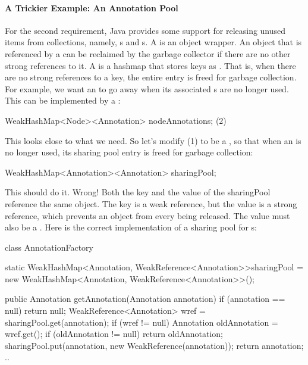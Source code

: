 \paragraph{A Trickier Example: An Annotation Pool}
For the second requirement, Java provides some support for releasing unused
items from collections, namely, s and s. 
A  is an object wrapper. An object that is referenced by
a  can be reclaimed by the garbage
collector if there are no other strong references to it. A 
is a hashmap that stores keys as . That is, when there are no
strong references to a key, the entire entry is freed for garbage collection. 
 For example, we want an  to
go away when its associated s are no longer used.
This can be implemented by a :
\begin{shortlisting}
   WeakHashMap<Node><Annotation> nodeAnnotations;        (2)
\end{shortlisting}

This looks close to what we need. So let's modify (1) to be a
, so that when an  is no longer used,
 its sharing pool entry is freed for
garbage collection:
\begin{shortlisting}
   WeakHashMap<Annotation><Annotation> sharingPool;     
\end{shortlisting}
This should do it. Wrong! Both the key and the value of the sharingPool
 reference the same  object. The key is a
weak reference, but the value is a strong reference, which prevents an
 object from every being released. The value must also be a
. Here is the correct
implementation of a sharing pool for s:
\begin{shortlisting}
class AnnotationFactory {
   static WeakHashMap<Annotation, WeakReference<Annotation>>sharingPool = 
                   new WeakHashMap<Annotation, WeakReference<Annotation>>();
    
    public Annotation getAnnotation(Annotation annotation) {
        if (annotation == null) return null;
        WeakReference<Annotation> wref = sharingPool.get(annotation);
        if (wref != null) {
            Annotation oldAnnotation = wref.get();
            if (oldAnnotation != null) {
                return oldAnnotation;
            }
        }
        sharingPool.put(annotation, new WeakReference(annotation));
        return annotation;
    }
    ..
}
\end{shortlisting}

